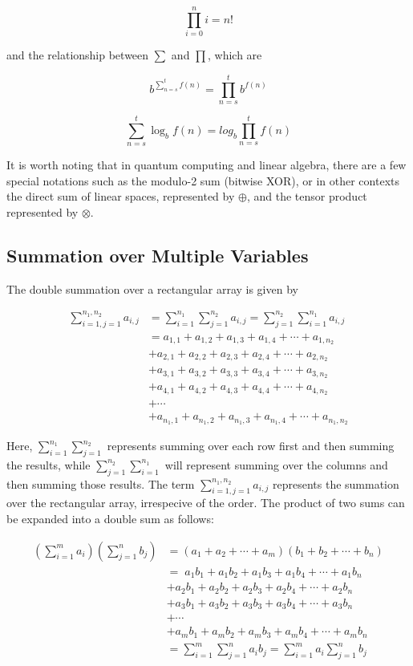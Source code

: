 \documentclass[12pt]{article}
\theoremstyle{plain}
\theoremstyle{definition}
\begin{document}
$$\prod_{i=0}^{n} i = n!$$

and the relationship between $\sum$ and $\prod$, which are 

$$b^{\sum_{n=s}^{t} f(n)} = \prod_{n=s}^{t} b^{f(n)}$$

$$\sum_{n=s}^{t} \log_b f(n) = log_b \prod_{n=s}^{t} f(n)$$

It is worth noting that in quantum computing and linear algebra, there are a few special notations such as the modulo-2 sum (bitwise XOR), or in other contexts the direct sum of linear spaces, represented by $\oplus$, and the tensor product represented by $\otimes$.

\subsection{Summation over Multiple Variables}

The double summation over a rectangular array is given by 

\begin{align*}
    \sum_{i=1,j=1}^{n_1, n_2} a_{i,j} &= \sum_{i=1}^{n_1} \sum_{j=1}^{n_2} a_{i, j} = \sum_{j=1}^{n_2} \sum_{i=1}^{n_1} a_{i, j} \\
    &= a_{1, 1} + a_{1, 2} + a_{1, 3} + a_{1, 4} + \cdots + a_{1, n_2} \\
    &+ a_{2, 1} + a_{2, 2} + a_{2, 3} + a_{2, 4} + \cdots + a_{2, n_2} \\
    & + a_{3, 1} + a_{3, 2} + a_{3, 3} + a_{3, 4} + \cdots + a_{3, n_2} \\
    & + a_{4, 1} + a_{4, 2} + a_{4, 3} + a_{4, 4} + \cdots + a_{4, n_2} \\
    & + \cdots \\
    & + a_{n_1, 1} + a_{n_1, 2} + a_{n_1, 3} + a_{n_1, 4} + \cdots + a_{n_1, n_2}
\end{align*}

Here, $\sum_{i=1}^{n_1} \sum_{j=1}^{n_2}$ represents summing over each row first and then summing the results, while $\sum_{j=1}^{n_2} \sum_{i=1}^{n_1}$ will represent summing over the columns and then summing those results. The term $\sum_{i=1,j=1}^{n_1, n_2} a_{i,j}$ represents the summation over the rectangular array, irrespecive of the order. The product of two sums can be expanded into a double sum as follows:

\begin{align*}
\left( \sum_{i=1}^{m} a_i \right) \left( \sum_{j=1}^{n} b_j \right)
    &= (a_1 + a_2 + \cdots + a_m)(b_1 + b_2 + \cdots + b_n) \\
    &=\; a_1b_1 + a_1b_2 + a_1b_3 + a_1b_4 + \cdots + a_1b_n \\
    &+ a_2b_1 + a_2b_2 + a_2b_3 + a_2b_4 + \cdots + a_2b_n \\
    &+ a_3b_1 + a_3b_2 + a_3b_3 + a_3b_4 + \cdots + a_3b_n \\
    &+ \cdots \\
    &+ a_mb_1 + a_mb_2 + a_mb_3 + a_mb_4 + \cdots + a_mb_n \\
    &= \sum_{i=1}^{m} \sum_{j=1}^{n} a_i b_j = \sum_{i=1}^{m} a_i \sum_{j=1}^{n} b_j
\end{align*}
\end{document}
